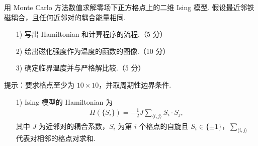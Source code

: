 \documentclass{assignment}
\begin{document}
\begin{prob}
    用 Monte Carlo 方法数值求解零场下正方格点上的二维 Ising 模型. 假设最近邻铁磁耦合，且任何近邻对的耦合能量相同.
    \begin{itemize}
        \item[1)] 写出 Hamiltonian 和计算程序的流程.（5 分）
        \item[2)] 绘出磁化强度作为温度的函数的图像.（10 分）
        \item[3)] 确定临界温度并与严格解比较.（5 分）
    \end{itemize}
    提示：要求格点至少为 $10\times 10$，并取周期性边界条件.
\end{prob}
\begin{sol}
    \begin{itemize}
        \item[1)] Ising 模型的 Hamiltonian 为
        \begin{align}
            H(\{S_i\})=-\frac{1}{2}J\sum_{\langle i,j\rangle}S_i\cdot S_j,
        \end{align}
        其中 $J$ 为近邻对的耦合系数，$S_i$ 为第 $i$ 个格点的自旋且 $S_i\in\{\pm 1\}$，$\sum_{\langle i,j\rangle}$ 代表对相邻的格点对求和.


\end{itemize}
\end{sol}
\end{document}
